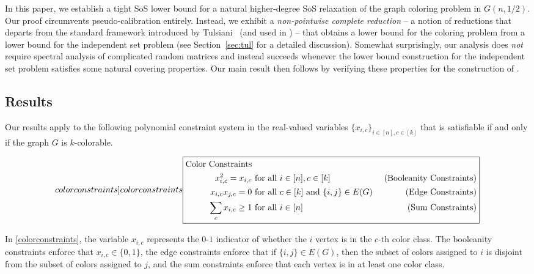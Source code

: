 \documentclass[10pt,a4paper]{article}
\theoremstyle{definition}
\newcommand{\colorconstraints}{\text{Color Constraints}}
\begin{document}
In this paper, we establish a tight SoS lower bound for a natural higher-degree SoS relaxation of the graph coloring problem in $G(n,1/2)$. Our proof circumvents pseudo-calibration entirely. Instead, we exhibit a \emph{non-pointwise complete reduction} -- a notion of reductions that departs from the standard framework introduced by Tulsiani~\cite{MR2780076-Tulsiani09} (and used in \cite{DBLP:conf/soda/BhaskaraCVGZ12}) -- that  obtains a lower bound for the coloring problem from a lower bound for the independent set problem (see Section~\cref{sec:tul} for a detailed discussion). Somewhat surprisingly, our analysis does \emph{not} require spectral analysis of complicated random matrices and instead succeeds whenever the lower bound construction for the independent set problem satisfies some natural covering properties. Our main result then follows by verifying these properties for the construction of \cite{DBLP:conf/focs/BarakHKKMP16}.

\subsection{Results}
Our results apply to the following polynomial constraint system in the real-valued variables $\{x_{i,c}\}_{i \in[n], c \in [k]}$ that is satisfiable if and only if the graph $G$ is $k$-colorable.

\begin{center}
\begin{subequations}
\label[colorconstraints]{colorconstraints}
\boxed{
\begin{aligned}
\textrm{\colorconstraints} \\
x_{i,c}^2 = x_{i,c} &\text{ for all } i \in [n], c \in [k] & \ \text{(Booleanity Constraints)} \\
x_{i,c} x_{j,c} = 0 &\text{ for all } c\in [k] \text{ and } \{i,j\} \in E(G) & \ \text{(Edge Constraints)}  \\
\sum_{c} x_{i,c} \geq 1 &\text{ for all } i \in [n] & \ \text{(Sum Constraints)}
\end{aligned}
}
\end{subequations}
\end{center}
 In \cref{colorconstraints}, the variable $x_{i,c}$ represents the $0$-$1$ indicator of whether the $i$ vertex is in the $c$-th color class.
 The booleanity constraints enforce that $x_{i,c} \in \{0,1\}$, the edge constraints enforce that if $\{i,j\} \in E(G)$, then the subset of colors assigned to $i$ is disjoint from the subset of colors assigned to $j$, and the sum constraints enforce that each vertex is in at least one color class.
\end{document}
